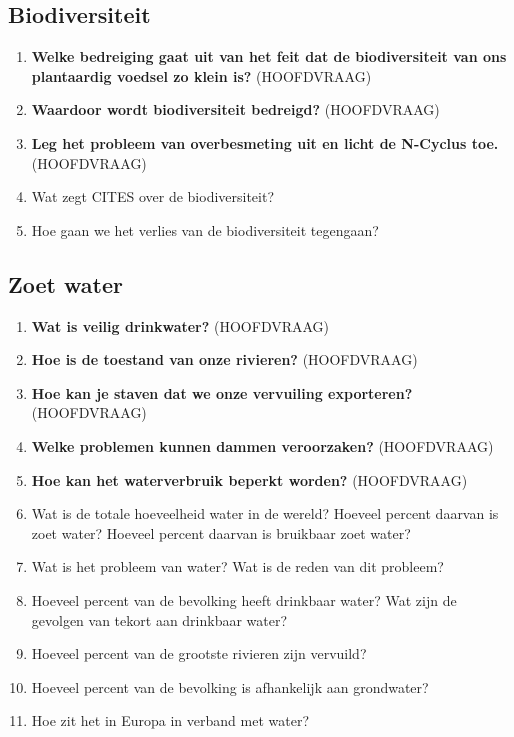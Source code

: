 \documentclass[12pt]{article}
\begin{document}
    \subsection{Biodiversiteit}
    \begin{enumerate}
        \item \textbf{Welke bedreiging gaat uit van het feit dat de biodiversiteit van ons plantaardig voedsel zo klein is?} (HOOFDVRAAG)
        \item \textbf{Waardoor wordt biodiversiteit bedreigd?} (HOOFDVRAAG)
        \item \textbf{Leg het probleem van overbesmeting uit en licht de N-Cyclus toe.} (HOOFDVRAAG)
        \item Wat zegt CITES over de biodiversiteit?
        \item Hoe gaan we het verlies van de biodiversiteit tegengaan?
    \end{enumerate}

    \subsection{Zoet water}
    \begin{enumerate}
        \item \textbf{Wat is veilig drinkwater?} (HOOFDVRAAG)
        \item \textbf{Hoe is de toestand van onze rivieren?} (HOOFDVRAAG)
        \item \textbf{Hoe kan je staven dat we onze vervuiling exporteren?} (HOOFDVRAAG)
        \item \textbf{Welke problemen kunnen dammen veroorzaken?} (HOOFDVRAAG)
        \item \textbf{Hoe kan het waterverbruik beperkt worden?} (HOOFDVRAAG)
        \item Wat is de totale hoeveelheid water in de wereld? Hoeveel percent daarvan is zoet water? Hoeveel percent daarvan is bruikbaar zoet water?
        \item Wat is het probleem van water? Wat is de reden van dit probleem?
        \item Hoeveel percent van de bevolking heeft drinkbaar water? Wat zijn de gevolgen van tekort aan drinkbaar water?
        \item Hoeveel percent van de grootste rivieren zijn vervuild?
        \item Hoeveel percent van de bevolking is afhankelijk aan grondwater?
        \item Hoe zit het in Europa in verband met water?
    \end{enumerate}
\end{document}
